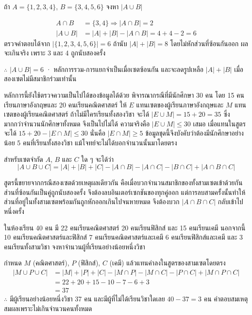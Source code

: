 \begin{ex}
\label{ex:inclusion-exclusion}
ถ้า $A = \{1, 2, 3, 4\}$, $B = \{3, 4, 5, 6\}$ จงหา $|A \cup B|$
\end{ex}
\begin{solution}
\begin{align*}
A \cap B &= \{3,4\} \Rightarrow |A \cap B| = 2\\
|A \cup B| &= |A| + |B| - |A \cap B| = 4 + 4 - 2 = 6
\end{align*}
ตรวจคำตอบได้จาก $|\{1,2,3,4,5,6\}| = 6$ ถ้านับ $|A|+|B| = 8$ โดยไม่หักส่วนที่ซ้อนกันออก ผลจะเกินจริง เพราะ 3 และ 4 ถูกนับสองครั้ง

$\therefore$ $|A \cup B| = 6$ · หลักการรวม-การแยกจำเป็นเมื่อเซตซ้อนกัน และจะลดรูปเหลือ $|A|+|B|$ เมื่อสองเซตไม่มีสมาชิกร่วมเท่านั้น \solhere
\end{solution}

หลักการนี้ยังใช้ตรวจความเป็นไปได้ของข้อมูลได้ด้วย พิจารณากรณีที่มีนักศึกษา 30 คน โดย 15 คนเรียนภาษาอังกฤษและ 20 คนเรียนคณิตศาสตร์ ให้ $E$ แทนเซตของผู้เรียนภาษาอังกฤษและ $M$ แทนเซตของผู้เรียนคณิตศาสตร์ ถ้าไม่มีใครเรียนทั้งสองวิชา จะได้ $|E \cup M| = 15 + 20 = 35$ ซึ่งมากกว่าจำนวนนักศึกษาทั้งหมด จึงเป็นไปไม่ได้ ความจริงคือ $|E \cup M| \leq 30$ เสมอ เมื่อแทนในสูตรจะได้ $15 + 20 - |E \cap M| \leq 30$ นั่นคือ $|E \cap M| \geq 5$ ข้อมูลชุดนี้จึงบังคับว่าต้องมีนักศึกษาอย่างน้อย 5 คนที่เรียนทั้งสองวิชา แม้โจทย์จะไม่ได้บอกจำนวนนั้นมาโดยตรง

\begin{principle}
\label{prin:inclusion-exclusion-three}
สำหรับเซตจำกัด $A$, $B$ และ $C$ ใด ๆ จะได้ว่า
\[
|A \cup B \cup C| = |A| + |B| + |C| - |A \cap B| - |A \cap C| - |B \cap C| + |A \cap B \cap C|
\]
\end{principle}

สูตรนี้ขยายจากกรณีสองเซตด้วยเหตุผลเดียวกัน คือเมื่อบวกจำนวนสมาชิกของทั้งสามเซตเข้าด้วยกัน ส่วนที่ซ้อนกันเป็นคู่ถูกนับสองครั้ง จึงต้องลบอินเตอร์เซกชันของทุกคู่ออก แต่การลบสามครั้งนั้นทำให้ส่วนที่อยู่ในทั้งสามเซตพร้อมกันถูกหักออกเกินไปจนหายหมด จึงต้องบวก $|A \cap B \cap C|$ กลับเข้าไปหนึ่งครั้ง

\begin{ex}
\label{ex:inclusion-exclusion-three}
ในห้องเรียน 40 คน มี 22 คนเรียนคณิตศาสตร์ 20 คนเรียนฟิสิกส์ และ 15 คนเรียนเคมี นอกจากนี้ 10 คนเรียนคณิตศาสตร์และฟิสิกส์ 7 คนเรียนคณิตศาสตร์และเคมี 6 คนเรียนฟิสิกส์และเคมี และ 3 คนเรียนทั้งสามวิชา จงหาจำนวนผู้ที่เรียนอย่างน้อยหนึ่งวิชา
\end{ex}
\begin{solution}
กำหนด $M$ (คณิตศาสตร์), $P$ (ฟิสิกส์), $C$ (เคมี) แล้วแทนค่าลงในสูตรของสามเซตโดยตรง
\begin{align*}
|M \cup P \cup C| &= |M|+|P|+|C|-|M\cap P|-|M\cap C|-|P\cap C|+|M\cap P\cap C|\\
                  &= 22+20+15-10-7-6+3\\
                  &= 37
\end{align*}
$\therefore$ มีผู้เรียนอย่างน้อยหนึ่งวิชา 37 คน และมีผู้ที่ไม่ได้เรียนวิชาใดเลย $40 - 37 = 3$ คน คำตอบสมเหตุสมผลเพราะไม่เกินจำนวนคนทั้งหมด \solhere
\end{solution}

